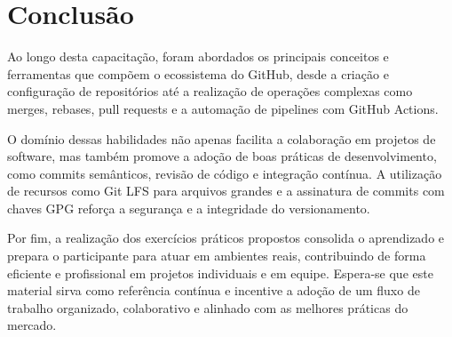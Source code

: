 \chapter{Conclusão}

Ao longo desta capacitação, foram abordados os principais conceitos e ferramentas que compõem o ecossistema do GitHub, desde a criação e configuração de repositórios até a realização de operações complexas como merges, rebases, pull requests e a automação de pipelines com GitHub Actions.

O domínio dessas habilidades não apenas facilita a colaboração em projetos de software, mas também promove a adoção de boas práticas de desenvolvimento, como commits semânticos, revisão de código e integração contínua. A utilização de recursos como Git LFS para arquivos grandes e a assinatura de commits com chaves GPG reforça a segurança e a integridade do versionamento.

Por fim, a realização dos exercícios práticos propostos consolida o aprendizado e prepara o participante para atuar em ambientes reais, contribuindo de forma eficiente e profissional em projetos individuais e em equipe. Espera-se que este material sirva como referência contínua e incentive a adoção de um fluxo de trabalho organizado, colaborativo e alinhado com as melhores práticas do mercado.
